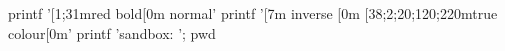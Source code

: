 \documentclass{article}
\begin{document}
\begin{ansitermexec}[show-input=true,cache=refresh,lines={1-}]
printf '[1;31mred bold[0m normal\n'
printf '[7m inverse [0m [38;2;20;120;220mtrue colour[0m\n'
printf 'sandbox: '; pwd
\end{ansitermexec}
\end{document}
